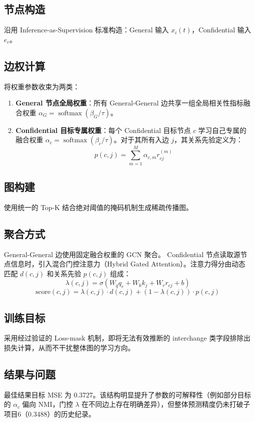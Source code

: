 \documentclass[UTF8]{ctexart}
\begin{document}
\subsection{节点构造}
沿用 Inference-as-Supervision 标准构造：General 输入 $x_i(t)$，Confidential 输入 $e_c$。

\subsection{边权计算}
将权重参数收束为两类：
\begin{enumerate}
    \item \textbf{General 节点全局权重}：所有 General-General 边共享一组全局相关性指标融合权重 $\alpha_G = \operatorname{softmax}(\beta_G / \tau)$。
    \item \textbf{Confidential 目标专属权重}：每个 Confidential 目标节点 $c$ 学习自己专属的融合权重 $\alpha_c = \operatorname{softmax}(\beta_c / \tau)$。对于其所有入边 $j$，其关系先验定义为：
    \[
    p(c,j) = \sum_{m=1}^M \alpha_{c,m} r_{cj}^{(m)}
    \]
\end{enumerate}

\subsection{图构建}
使用统一的 Top-K 结合绝对阈值的掩码机制生成稀疏传播图。

\subsection{聚合方式}
General-General 边使用固定融合权重的 GCN 聚合。
Confidential 节点读取源节点信息时，引入混合门控注意力（Hybrid Gated Attention）。注意力得分由动态匹配 $d(c,j)$ 和关系先验 $p(c,j)$ 组成：
\[
\lambda(c,j) = \sigma(W_q q_c + W_k k_j + W_r r_{cj} + b)
\]
\[
\text{score}(c,j) = \lambda(c,j) \cdot d(c,j) + (1 - \lambda(c,j)) \cdot p(c,j)
\]

\subsection{训练目标}
采用经过验证的 Loss-mask 机制，即将无法有效推断的 interchange 类字段排除出损失计算，从而不干扰整体图的学习方向。

\subsection{结果与问题}
最佳结果目标 MSE 为 0.3727。该结构明显提升了参数的可解释性（例如部分目标的 $\alpha_c$ 偏向 NMI，门控 $\lambda$ 在不同边上存在明确差异），但整体预测精度仍未打破子项目6（0.3488）的历史纪录。
\end{document}
